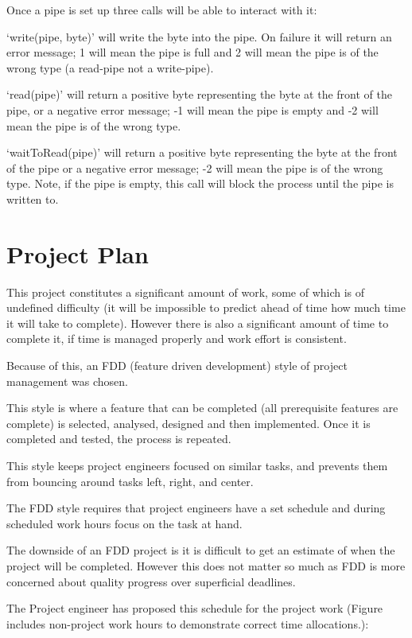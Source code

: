 \documentclass[a4paper]{report}
\begin{document}
Once a pipe is set up three calls will be able to interact with it:

`write(pipe, byte)' will write the byte into the pipe. On failure it will return an error message; 1 will mean the pipe is full and 2 will mean the pipe is of the wrong type (a read-pipe not a write-pipe).

`read(pipe)' will return a positive byte representing the byte at the front of the pipe, or a negative error message; -1 will mean the pipe is empty and -2 will mean the pipe is of the wrong type.

`waitToRead(pipe)' will return a positive byte representing the byte at the front of the pipe or a negative error message; -2 will mean the pipe is of the wrong type. Note, if the pipe is empty, this call will block the process until the pipe is written to.

\chapter{Project Plan}

This project constitutes a significant amount of work, some of which is of undefined difficulty (it will be impossible to predict ahead of time how much time it will take to complete). However there is also a significant amount of time to complete it, if time is managed properly and work effort is consistent.

Because of this, an FDD (feature driven development) style of project management was chosen.

This style is where a feature that can be completed (all prerequisite features are complete) is selected, analysed, designed and then implemented. Once it is completed and tested, the process is repeated.

This style keeps project engineers focused on similar tasks, and prevents them from bouncing around tasks left, right, and center.

The FDD style requires that project engineers have a set schedule and during scheduled work hours focus on the task at hand.

The downside of an FDD project is it is difficult to get an estimate of when the project will be completed. However this does not matter so much as FDD is more concerned about quality progress over superficial deadlines.

The Project engineer has proposed this schedule for the project work (Figure includes non-project work hours to demonstrate correct time allocations.):
\end{document}
